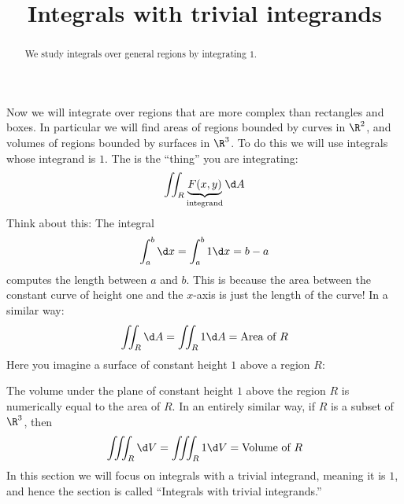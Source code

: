 \documentclass{ximera}
\title[Dig-In:]{Integrals with trivial integrands}
\begin{document}
\begin{abstract}
  We study integrals over general regions by integrating $1$.
\end{abstract}
\maketitle


Now we will integrate over regions that are more complex than
rectangles and boxes. In particular we will find areas of regions
bounded by curves in $\R^2$, and volumes of regions bounded by
surfaces in $\R^3$. To do this we will use integrals whose integrand
is $1$. The  is the ``thing'' you are integrating:
\[
\iint_R \underbrace{F(x,y)}_{\text{integrand}} \d A
\]
Think about this: The integral
\[
\int_a^b \d x = \int_a^b 1 \d x = b-a
\]
computes the length between $a$ and $b$. This is because the area
between the constant curve of height one and the $x$-axis is just the
length of the curve! In a similar way:
\[
\iint_R \d A = \iint_R 1 \d A = \text{Area of $R$}
\]
Here you imagine a surface of constant height $1$ above a region $R$:
  \begin{image}
  \end{image}
The volume under the plane of constant height $1$ above the region $R$
is numerically equal to the area of $R$. In an entirely similar way, if $R$ is a subset of $\R^3$, then 
\[
\iiint_R \d V = \iiint_R 1 \d V= \text{Volume of $R$}
\]
In this section we will focus on integrals with a trivial integrand,
meaning it is $1$, and hence the section is called ``Integrals with
trivial integrands.''
\end{document}
